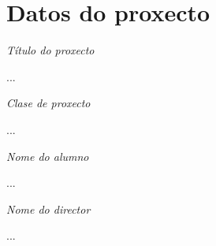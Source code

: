 %
%
\section*{Datos do proxecto}


{\it Título do proxecto}
\begin{center}
	...
\end{center}

{\it Clase de proxecto}
\begin{center}
	...
\end{center}

{\it Nome do alumno}
\begin{center}
	...
\end{center}

{\it Nome do director}
\begin{center}
	...
\end{center}


